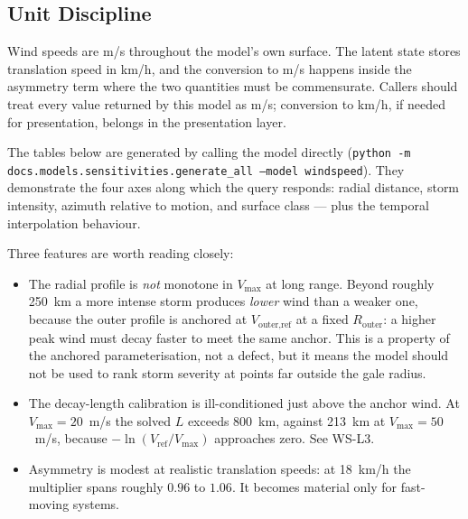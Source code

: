 \documentclass[11pt,a4paper]{article}
\begin{document}
\subsection{Unit Discipline}
Wind speeds are m/s throughout the model's own surface. The latent state stores
translation speed in km/h, and the conversion to m/s happens inside the
asymmetry term where the two quantities must be commensurate. Callers should
treat every value returned by this model as m/s; conversion to km/h, if needed
for presentation, belongs in the presentation layer.

\mkmsensitivity
\label{sec:sensitivity}

The tables below are generated by calling the model directly
(\texttt{python -m docs.models.sensitivities.generate\_all --model windspeed}).
They demonstrate the four axes along which the query responds: radial distance,
storm intensity, azimuth relative to motion, and surface class --- plus the
temporal interpolation behaviour.

Three features are worth reading closely:

\begin{itemize}
  \item The radial profile is \emph{not} monotone in $V_{\max}$ at long range.
        Beyond roughly 250~km a more intense storm produces \emph{lower} wind
        than a weaker one, because the outer profile is anchored at
        $V_{\text{outer,ref}}$ at a fixed $R_{\text{outer}}$: a higher peak wind
        must decay faster to meet the same anchor. This is a property of the
        anchored parameterisation, not a defect, but it means the model should
        not be used to rank storm severity at points far outside the gale radius.
  \item The decay-length calibration is ill-conditioned just above the anchor
        wind. At $V_{\max} = 20$~m/s the solved $L$ exceeds 800~km, against
        213~km at $V_{\max} = 50$~m/s, because $-\ln(V_{\text{ref}}/V_{\max})$
        approaches zero. See WS-L3.
  \item Asymmetry is modest at realistic translation speeds: at 18~km/h the
        multiplier spans roughly $0.96$ to $1.06$. It becomes material only for
        fast-moving systems.
\end{itemize}


\end{document}
